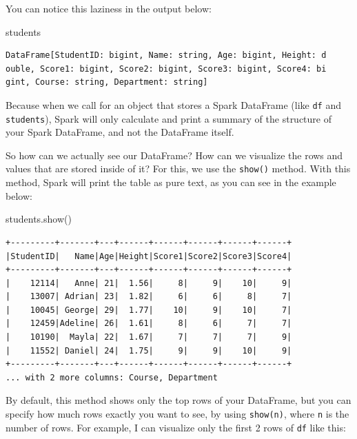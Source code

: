 \documentclass[
  11pt,
  letterpaper,
  DIV=11,
  numbers=noendperiod]{scrreprt}
\newenvironment{Shaded}{\begin{snugshade}}{\end{snugshade}}
\newcommand{\NormalTok}[1]{\textcolor[rgb]{0.00,0.23,0.31}{#1}}
\begin{document}
You can notice this laziness in the output below:

\begin{Shaded}
\begin{Highlighting}[]
\NormalTok{students}
\end{Highlighting}
\end{Shaded}

\begin{verbatim}
DataFrame[StudentID: bigint, Name: string, Age: bigint, Height: d
ouble, Score1: bigint, Score2: bigint, Score3: bigint, Score4: bi
gint, Course: string, Department: string]
\end{verbatim}

Because when we call for an object that stores a Spark DataFrame (like
\texttt{df} and \texttt{students}), Spark will only calculate and print
a summary of the structure of your Spark DataFrame, and not the
DataFrame itself.

So how can we actually see our DataFrame? How can we visualize the rows
and values that are stored inside of it? For this, we use the
\texttt{show()} method. With this method, Spark will print the table as
pure text, as you can see in the example below:

\begin{Shaded}
\begin{Highlighting}[]
\NormalTok{students.show()}
\end{Highlighting}
\end{Shaded}


\begin{verbatim}
+---------+-------+---+------+------+------+------+------+
|StudentID|   Name|Age|Height|Score1|Score2|Score3|Score4|
+---------+-------+---+------+------+------+------+------+
|    12114|   Anne| 21|  1.56|     8|     9|    10|     9|
|    13007| Adrian| 23|  1.82|     6|     6|     8|     7|
|    10045| George| 29|  1.77|    10|     9|    10|     7|
|    12459|Adeline| 26|  1.61|     8|     6|     7|     7|
|    10190|  Mayla| 22|  1.67|     7|     7|     7|     9|
|    11552| Daniel| 24|  1.75|     9|     9|    10|     9|
+---------+-------+---+------+------+------+------+------+
... with 2 more columns: Course, Department
\end{verbatim}

By default, this method shows only the top rows of your DataFrame, but
you can specify how much rows exactly you want to see, by using
\texttt{show(n)}, where \texttt{n} is the number of rows. For example, I
can visualize only the first 2 rows of \texttt{df} like this:
\end{document}
